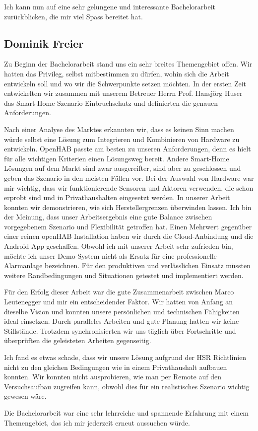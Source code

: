 Ich kann nun auf eine sehr gelungene und interessante Bachelorarbeit zurückblicken, die mir viel Spass bereitet hat.

\pagebreak

\subsection*{Dominik Freier}
Zu Beginn der Bachelorarbeit stand uns ein sehr breites Themengebiet offen. Wir hatten das Privileg, selbst mitbestimmen zu dürfen, wohin sich die Arbeit entwickeln soll und wo wir die Schwerpunkte setzen möchten. In der ersten Zeit entwickelten wir zusammen mit unserem Betreuer Herrn Prof. Hansjörg Huser das Smart-Home Szenario Einbruchschutz und definierten die genauen Anforderungen. 

Nach einer Analyse des Marktes erkannten wir, dass es keinen Sinn machen würde selbst eine Lösung zum Integrieren und Kombinieren von Hardware zu entwickeln. OpenHAB passte am besten zu unseren Anforderungen, denn es hielt für alle wichtigen Kriterien einen Lösungsweg bereit. Andere Smart-Home Lösungen auf dem Markt sind zwar ausgereifter, sind aber zu geschlossen und geben das Szenario in den meisten Fällen vor. Bei der Auswahl von Hardware war mir wichtig, dass wir funktionierende Sensoren und Aktoren verwenden, die schon erprobt sind und in Privathaushalten eingesetzt werden. In unserer Arbeit konnten wir demonstrieren, wie sich Herstellergrenzen überwinden lassen. Ich bin der Meinung, dass unser Arbeitsergebnis eine gute Balance zwischen vorgegebenem Szenario und Flexibilität getroffen hat. Einen Mehrwert gegenüber einer reinen openHAB Installation haben wir durch die Cloud-Anbindung und die Android App geschaffen. Obwohl ich mit unserer Arbeit sehr zufrieden bin, möchte ich unser Demo-System nicht als Ersatz für eine professionelle Alarmanlage bezeichnen. Für den produktiven und verlässlichen Einsatz müssten weitere Randbedingungen und Situationen getestet und implementiert werden.

Für den Erfolg dieser Arbeit war die gute Zusammenarbeit zwischen Marco Leutenegger und mir ein entscheidender Faktor. Wir hatten von Anfang an dieselbe Vision und konnten unsere persönlichen und technischen Fähigkeiten ideal einsetzen. Durch paralleles Arbeiten und gute Planung hatten wir keine Stillstände. Trotzdem synchronisierten wir uns täglich über Fortschritte und überprüften die geleisteten Arbeiten gegenseitig. 

Ich fand es etwas schade, dass wir unsere Lösung aufgrund der HSR Richtlinien nicht zu den gleichen Bedingungen wie in einem Privathaushalt aufbauen konnten. Wir konnten nicht ausprobieren, wie man per Remote auf den Versuchsaufbau zugreifen kann, obwohl dies für ein realistisches Szenario wichtig gewesen wäre.

Die Bachelorarbeit war eine sehr lehrreiche und spannende Erfahrung mit einem Themengebiet, das ich mir jederzeit erneut aussuchen würde.

